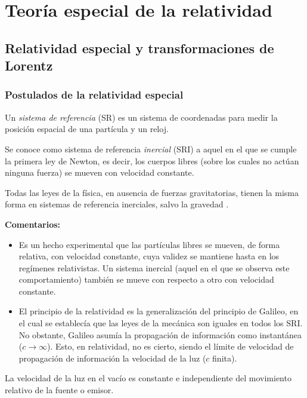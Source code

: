 \chapter[Relatividad especial]{Teoría especial de la relatividad}
\section[Relatividad. Transf. de Lorentz.]{Relatividad especial y transformaciones de Lorentz}
\subsection{Postulados de la relatividad especial}
\begin{define}
    Un \emph{sistema de referencia} (SR) es un sistema de coordenadas para medir la posición espacial de una partícula y un reloj.
\end{define}

\begin{define}
    Se conoce como sistema de referencia \emph{inercial} (SRI) a aquel en el que se cumple la primera ley de Newton, es decir, los cuerpos libres (sobre los cuales no actúan ninguna fuerza) se mueven con velocidad constante.
\end{define}
\begin{postula}
   Todas las leyes de la física, en ausencia de fuerzas gravitatorias, tienen la misma forma en sistemas de referencia inerciales, salvo la gravedad .
\end{postula}
\textbf{Comentarios:}
\begin{itemize}
    \item Es un hecho experimental que las partículas libres se mueven, de forma relativa, con velocidad constante, cuya validez se mantiene hasta en los regímenes relativistas. Un sistema inercial (aquel en el que se observa este comportamiento) también se mueve con respecto a otro con velocidad constante. 

    \item El principio de la relatividad es la generalización del principio de Galileo, en el cual se establecía que las leyes de la mecánica son iguales en todos los SRI. No obstante, Galileo asumía la propagación de información como instantánea ($c\to \infty$). Esto, en relatividad, no es cierto, siendo el límite de velocidad de propagación de información la velocidad de la luz ($c$ finita). 
\end{itemize}

\begin{postula}
    La velocidad de la luz en el vacío es constante e independiente del movimiento relativo de la fuente o emisor.
\end{postula}

